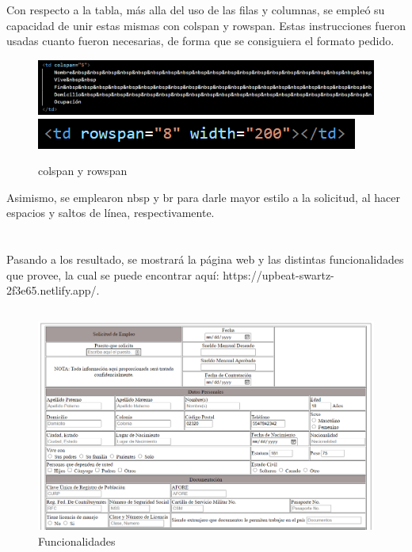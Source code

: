 \documentclass[10pt,a4paper]{article}
\begin{document}
Con respecto a la tabla, más alla del uso de las filas y columnas, se empleó su capacidad de unir estas mismas con colspan y rowspan. Estas instrucciones fueron usadas cuanto fueron necesarias, de forma que se consiguiera el formato pedido.

\begin{figure}[H]
	\includegraphics[scale=.54]{Capture11}
	\includegraphics[scale=.54]{Capture12}
	\centering
	\caption{colspan y rowspan}
	\label{img:Capture12}
\end{figure} 

Asimismo, se emplearon nbsp y br para darle mayor estilo a la solicitud, al hacer espacios y saltos de línea, respectivamente.

\pagebreak

\section{\color{colorIPN}{Resultados}}

Pasando a los resultado, se mostrará la página web y las distintas funcionalidades que provee, la cual se puede encontrar aquí: https://upbeat-swartz-2f3e65.netlify.app/.
\subsection{	\color{colorESCOM}{Página Web}}

\begin{figure}[H]
	\includegraphics[scale=.54]{Capture10}
	\centering
	\caption{Funcionalidades}
	\label{img:Capture10}
\end{figure} 
\end{document}
